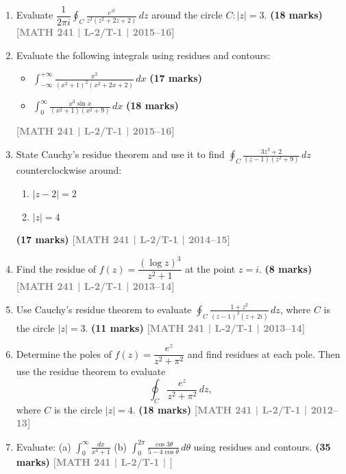 \documentclass[12pt,a3paper]{article}
\newcommand{\yr}[1]{\hfill\textcolor{gray}{\small\textbf{[#1]}}}
\newcommand{\mk}[1]{\textcolor{orange!70!black}{\small\textbf{(#1 marks)}}}
\begin{document}
\begin{enumerate}
\item Evaluate $\dfrac{1}{2\pi i}\displaystyle\oint_{C}\frac{e^{zt}}{z^{2}(z^{2}+2z+2)}\,dz$ around the circle $C:|z|=3$.
\mk{18} \yr{MATH 241 | L-2/T-1 | 2015--16}


\item Evaluate the following integrals using residues and contours:

\begin{itemize}
    \item[(a)] $\displaystyle \int_{-\infty}^{+\infty} \frac{x^2}{(x^2 + 1)^2 (x^2 + 2x + 2)} \, dx$
\mk{17}  
    
    \item[(b)] $\displaystyle \int_{0}^{\infty} \frac{x^3 \sin x}{(x^2 + 1)(x^2 + 9)} \, dx$
    \mk{18}
\end{itemize} 
\yr{MATH 241 | L-2/T-1 | 2015--16}


\item State Cauchy's residue theorem and use it to find $\displaystyle\oint_{C}\frac{3z^{3}+2}{(z-1)(z^{2}+9)}\,dz$ counterclockwise around:
\begin{enumerate}
  \item $|z-2|=2$
  \item $|z|=4$
\end{enumerate}
\mk{17} \yr{MATH 241 | L-2/T-1 | 2014--15}


\item Find the residue of $f(z)=\dfrac{(\log z)^{3}}{z^{2}+1}$ at the point $z=i$.
\mk{8} \yr{MATH 241 | L-2/T-1 | 2013--14}


\item Use Cauchy's residue theorem to evaluate $\displaystyle\oint_{C}\frac{1+z^{2}}{(z-1)^{2}(z+2i)}\,dz$, where $C$ is the circle $|z|=3$.
\mk{11} \yr{MATH 241 | L-2/T-1 | 2013--14}


\item Determine the poles of $f(z)=\dfrac{e^{z}}{z^{2}+\pi^{2}}$ and find residues at each pole. Then use the residue theorem to evaluate
\[
\oint_{C} \frac{e^{z}}{z^{2}+\pi^{2}}\,dz,
\]
where $C$ is the circle $|z|=4$.
\mk{18} \yr{MATH 241 | L-2/T-1 | 2012--13}


\item Evaluate: (a) $\displaystyle\int_{0}^{\infty}\frac{dx}{x^{4}+1}$ \quad (b) $\displaystyle\int_{0}^{2\pi}\frac{\cos 3\theta}{5-4\cos\theta}\,d\theta$ using residues and contours.
\mk{35} \yr{MATH 241 | L-2/T-1 | }


\end{enumerate}
\end{document}
